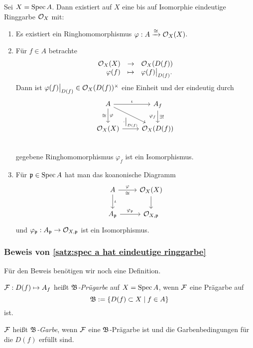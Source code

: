 \begin{satz}
	\label{satz:spec a hat eindeutige ringgarbe}
	Sei $X = \operatorname{Spec} A$. Dann existiert auf $X$ eine bis auf Isomorphie 
	eindeutige Ringgarbe $\mathcal{O}_X$ mit:
	\begin{enumerate}[label=\roman{*})]
	  \item Es existiert ein Ringhomomorphismus
	  	$\varphi: A \xrightarrow{\cong} \mathcal{O}_X(X)$.
	  \item Für $f\in A$ betrachte 
	  	\[\funcdef{ \O_X(X) & \to & \O_X(D(f)) \\
	  		\varphi(f) & \mapsto & \varphi(f) \rest{D(f)}.}\]
	  	Dann ist $\varphi(f)\big|_{D(f)} \in \mathcal{O}_X(D(f))^\times$ eine Einheit
	  	und der eindeutig durch 
	  	\[
	  	\begin{tikzcd}
	  		A \rar{\iota} \dar{\varphi}[swap]{\cong}
	  			\drar & A_f \dar{\exists!}[swap]{\varphi_f}\\
	  		\O_X(X) \rar{\cdot\rest{D(f)}} & \O_X(D(f))\\
	  	\end{tikzcd}
	  	\]
	  	gegebene Ringhomomorphismus $\varphi_f$ ist ein Isomorphismus.
	  \item Für $\mathfrak{p}\in \operatorname{Spec} A$ hat man das koanonische Diagramm
	  	\[\begin{tikzcd}
	  		A \rar{\varphi}[swap]{\cong}  \dar{\iota} 
	  			& \O_X(X) \dar \\
	  		A_\p \rar{\varphi_\p} & \O_{X,\p}
	  	\end{tikzcd}\]
	  	und $\varphi_\mathfrak{p}: A_\mathfrak{p} \to \mathcal{O}_{X,\mathfrak{p}}$ ist ein Isomorphismus.
	\end{enumerate}
\end{satz}

\subsubsection{Beweis von \autoref{satz:spec a hat eindeutige ringgarbe}}

Für den Beweis benötigen wir noch eine Definition.

\begin{definition}
	$\mathcal{F}:D(f) \mapsto A_f$ heißt \emph{$\mathfrak B$-Prügarbe} auf
	$X = \operatorname{Spec} A$, wenn 
	$\mathcal{F}$ eine Prägarbe auf 
	\[
		\mathfrak B := \{D(f) \subset X \mid f \in A\}
	\]
	ist.
	
	$\mathcal{F}$ heißt \emph{$\mathfrak B$-Garbe}, wenn $\mathcal{F}$ eine $\mathfrak B$-Prägarbe ist
	und die Garbenbedingungen für die $D(f)$ erfüllt sind.
\end{definition}

